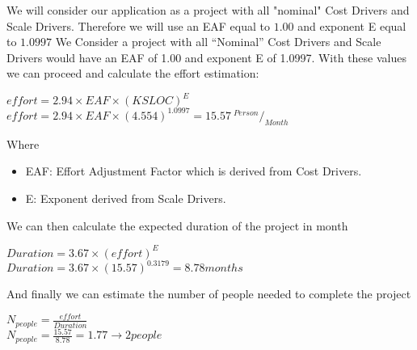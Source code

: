 We will consider our application as a project with all "nominal" Cost Drivers and
Scale Drivers. Therefore we will use an EAF equal to $1.00$ and exponent E equal to $1.0997$
We Consider a project with all “Nominal” Cost Drivers and Scale Drivers would have an EAF
of 1.00 and exponent E of 1.0997.
With these values we can proceed and calculate the effort estimation:
\begin{center}
		$  effort = 2.94 \times EAF \times (KSLOC)^E$ \\
		$  effort = 2.94 \times EAF \times (4.554)^1.0997= 15.57 \  ^{Person}/_{Month}$
\end{center}
Where
\begin{itemize}
	\item EAF: Effort Adjustment Factor which is derived from Cost Drivers.
	\item E: Exponent derived from Scale Drivers.
\end{itemize}

We can then calculate the expected duration of the project in month
\begin{center}
	$ Duration = 3.67 \times (effort)^E $ \\
	$ Duration = 3.67 \times (15.57)^{0.3179} = 8.78 months $
\end{center}

And finally we can estimate the number of people needed to complete the project

\begin{center}
	$ N_{people} = \frac {effort}{Duration}$ \\
	$ N_{people} = \frac {15.57}{8.78} = 1.77 \rightarrow 2 people $
\end{center}